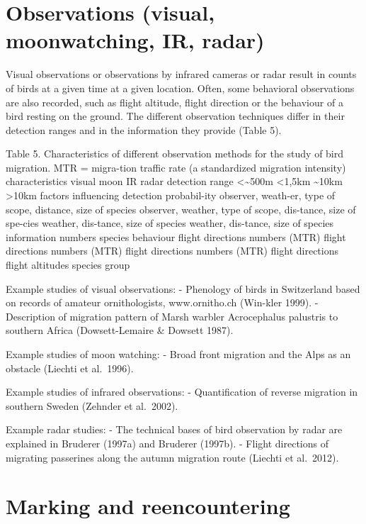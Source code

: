 \documentclass[
]{book}
\begin{document}
\hypertarget{observations-visual-moonwatching-ir-radar}{%
\section{Observations (visual, moonwatching, IR, radar)}\label{observations-visual-moonwatching-ir-radar}}

Visual observations or observations by infrared cameras or radar result in counts of birds at a given time at a given location. Often, some behavioral observations are also recorded, such as flight altitude, flight direction or the behaviour of a bird resting on the ground. The different observation techniques differ in their detection ranges and in the information they provide (Table 5).

Table 5. Characteristics of different observation methods for the study of bird migration. MTR = migra-tion traffic rate (a standardized migration intensity)
characteristics visual moon IR radar
detection range \textless\textasciitilde500m \textless1,5km \textasciitilde10km \textgreater10km
factors influencing detection probabil-ity observer, weath-er, type of scope, distance, size of species observer, weather, type of scope, dis-tance, size of spe-cies weather, dis-tance, size of species
weather, dis-tance, size of species
information numbers
species
behaviour
flight directions numbers (MTR)
flight directions numbers (MTR)
flight directions numbers (MTR)
flight directions
flight altitudes
species group

Example studies of visual observations:
- Phenology of birds in Switzerland based on records of amateur ornithologists, www.ornitho.ch (Win-kler 1999).
- Description of migration pattern of Marsh warbler Acrocephalus palustris to southern Africa (Dowsett-Lemaire \& Dowsett 1987).

Example studies of moon watching:
- Broad front migration and the Alps as an obstacle (Liechti et al.~1996).

Example studies of infrared observations:
- Quantification of reverse migration in southern Sweden (Zehnder et al.~2002).

Example radar studies:
- The technical bases of bird observation by radar are explained in Bruderer (1997a) and Bruderer (1997b).
- Flight directions of migrating passerines along the autumn migration route (Liechti et al.~2012).

\hypertarget{marking-and-reencountering}{%
\section{Marking and reencountering}\label{marking-and-reencountering}}
\end{document}
